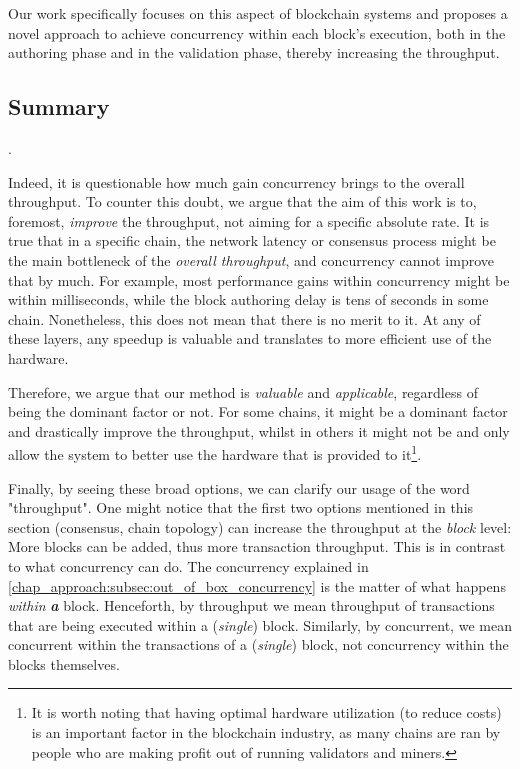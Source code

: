 Our work specifically focuses on this aspect of blockchain systems and proposes a novel approach
to achieve concurrency within each block's execution, both in the authoring phase and in the
validation phase, thereby increasing the throughput.

\subsection{Summary} \label{chap_bg:subsec:summary_speedup}

.

Indeed, it is questionable how much gain concurrency brings to the overall throughput. To
counter this doubt, we argue that the aim of this work is to, foremost, \textit{improve} the
throughput, not aiming for a specific absolute rate. It is true that in a specific chain, the
network latency or consensus process might be the main bottleneck of the \textit{overall
throughput}, and concurrency cannot improve that by much. For example, most performance gains within
concurrency might be within milliseconds, while the block authoring delay is tens of seconds in some
chain. Nonetheless, this does not mean that there is no merit to it. At any of these layers, any
speedup is valuable and translates to more efficient use of the hardware.

Therefore, we argue that our method is \textit{valuable} and \textit{applicable}, regardless of
being the dominant factor or not. For some chains, it might be a dominant factor and drastically
improve the throughput, whilst in others it might not be and only allow the system to better use the
hardware that is provided to it\footnote{It is worth noting that having optimal hardware utilization
(to reduce costs) is an important factor in the blockchain industry, as many chains are ran by
people who are making profit out of running validators and miners.}.

Finally, by seeing these broad options, we can clarify our usage of the word "throughput". One might
notice that the first two options mentioned in this section (consensus, chain topology) can increase
the throughput at the \textit{block} level: More blocks can be added, thus more transaction
throughput. This is in contrast to what concurrency can do. The concurrency explained in
\ref{chap_approach:subsec:out_of_box_concurrency} is the matter of what happens \textit{within}
\textit{\textbf{a}} block. Henceforth, by throughput we mean throughput of transactions that are
being executed within a (\textit{single}) block. Similarly, by concurrent, we mean concurrent within
the transactions of a (\textit{single}) block, not concurrency within the blocks themselves.


